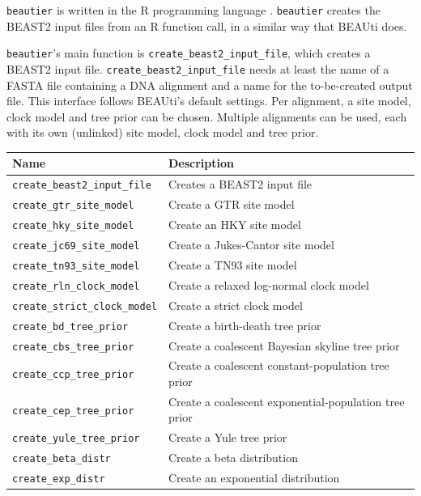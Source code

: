 \documentclass{article}
\begin{document}
\verb;beautier; is written in the R programming language \cite{R}.
\verb;beautier; creates the BEAST2 input files from an R function call,
in a similar way that BEAUti does.

\verb;beautier;'s main function is \verb;create_beast2_input_file;, which creates
a BEAST2 input file. \verb;create_beast2_input_file; needs at least the name of a FASTA file containing a DNA alignment
and a name for the to-be-created output file. This interface follows BEAUti's default settings.
Per alignment, a site model, clock model and tree prior can be chosen.
Multiple alignments can be used, each with its own (unlinked) site model, clock model and tree prior.

\begin{table}[]
\centering
\begin{tabular}{ | l | l | }
\hline
\textbf{Name} & \textbf{Description} \\
\hline
\verb;create_beast2_input_file; & Creates a BEAST2 input file \\
\hline
\verb;create_gtr_site_model; & Create a GTR site model \cite{tavare1986some} \\
\verb;create_hky_site_model; & Create an HKY site model \cite{hasegawa1985dating} \\
\verb;create_jc69_site_model; & Create a Jukes-Cantor site model \cite{cantor1969mammalian} \\
\verb;create_tn93_site_model; & Create a TN93 site model \cite{tamura1993estimation} \\
\hline
\verb;create_rln_clock_model; & Create a relaxed log-normal clock model \cite{drummond2006relaxed} \\
\verb;create_strict_clock_model; & Create a strict clock model \cite{sarich1967immunological} \\
\hline
\verb;create_bd_tree_prior; & Create a birth-death tree prior \cite{kendall1948generalized} \\
\verb;create_cbs_tree_prior; & Create a coalescent Bayesian skyline tree prior \\
\verb;create_ccp_tree_prior; & Create a coalescent constant-population tree prior \\
\verb;create_cep_tree_prior; & Create a coalescent exponential-population tree prior \\
\verb;create_yule_tree_prior; & Create a Yule tree prior \cite{yule} \\
\hline
\verb;create_beta_distr; & Create a beta distribution \\
\verb;create_exp_distr; & Create an exponential distribution \\

\end{tabular}
\end{table}
\end{document}
